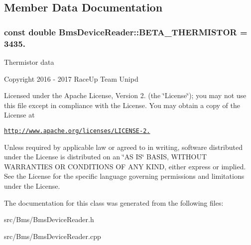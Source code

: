 \subsection{Member Data Documentation}
\subsubsection[{\texorpdfstring{B\+E\+T\+A\+\_\+\+T\+H\+E\+R\+M\+I\+S\+T\+OR}{BETA_THERMISTOR}}]{\setlength{\rightskip}{0pt plus 5cm}const double Bms\+Device\+Reader\+::\+B\+E\+T\+A\+\_\+\+T\+H\+E\+R\+M\+I\+S\+T\+OR = 3435.\hspace{0.3cm}{\ttfamily [static]}}\hypertarget{class_bms_device_reader_a00678a97467753d00db7f52209652bb9}{}\label{class_bms_device_reader_a00678a97467753d00db7f52209652bb9}
Thermistor data

Copyright 2016 -\/ 2017 Race\+Up Team Unipd

Licensed under the Apache License, Version 2. (the \char`\"{}\+License\char`\"{}); you may not use this file except in compliance with the License. You may obtain a copy of the License at

\href{http://www.apache.org/licenses/LICENSE-2.0}{\tt http\+://www.\+apache.\+org/licenses/\+L\+I\+C\+E\+N\+S\+E-\/2.}

Unless required by applicable law or agreed to in writing, software distributed under the License is distributed on an \char`\"{}\+A\+S I\+S\char`\"{} B\+A\+S\+IS, W\+I\+T\+H\+O\+UT W\+A\+R\+R\+A\+N\+T\+I\+ES OR C\+O\+N\+D\+I\+T\+I\+O\+NS OF A\+NY K\+I\+ND, either express or implied. See the License for the specific language governing permissions and limitations under the License. 

The documentation for this class was generated from the following files\+:\begin{DoxyCompactItemize}
\item 
src/\+Bms/Bms\+Device\+Reader.\+h\item 
src/\+Bms/Bms\+Device\+Reader.\+cpp\end{DoxyCompactItemize}
